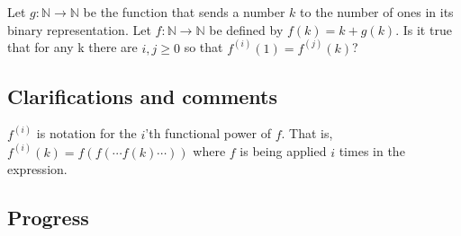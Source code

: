 \documentclass[10pt]{article}
\begin{document}
Let $g:\mathbb{N}\to\mathbb{N}$ be the function that sends a number $k$ to the number of ones in its binary representation. Let $f:\mathbb{N}\to\mathbb{N}$ be defined by $f(k)=k+g(k)$. Is it true that for any k there are $i,j\geq 0$ so that $f^{(i)}(1)=f^{(j)}(k)$?

\subsection{Clarifications and comments}

$f^{(i)}$ is notation for the $i$'th functional power of $f$. That is, $f^{(i)}(k)=f(f(\cdots f(k)\cdots ))$ where $f$ is being applied $i$ times in the expression.

\subsection{Progress}
\end{document}
